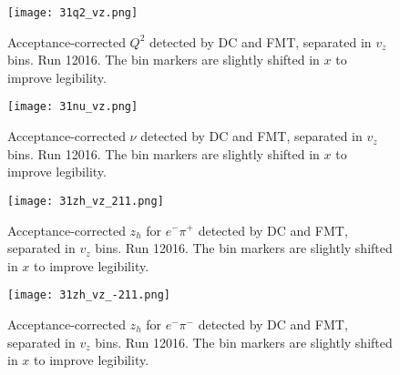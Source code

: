     \begin{figure}
        \centering
        \texttt{[image: 31q2\_vz.png]}
        \caption[Acceptance-corrected $Q^2$ separated in $v_z$ bins]
        {Acceptance-corrected $Q^2$ detected by DC and FMT, separated in $v_z$ bins.
        Run 12016.
        The bin markers are slightly shifted in $x$ to improve legibility.}
        \label{fig::14.31::q2_vz}
    \end{figure}

    \begin{figure}
        \centering
        \texttt{[image: 31nu\_vz.png]}
        \caption[Acceptance-corrected $\nu$ separated in $v_z$ bins]
        {Acceptance-corrected $\nu$ detected by DC and FMT, separated in $v_z$ bins.
        Run 12016.
        The bin markers are slightly shifted in $x$ to improve legibility.}
        \label{fig::14.31::nu_vz}
    \end{figure}

    \begin{figure}
        \centering
        \texttt{[image: 31zh\_vz\_211.png]}
        \caption[Acceptance-corrected $z_h$ for $e^-\pi^+$ separated in $v_z$ bins]
        {Acceptance-corrected $z_h$ for $e^-\pi^+$ detected by DC and FMT, separated in $v_z$ bins.
        Run 12016.
        The bin markers are slightly shifted in $x$ to improve legibility.}
        \label{fig::14.31::zh_211_vz}
    \end{figure}

    \begin{figure}
        \centering
        \texttt{[image: 31zh\_vz\_-211.png]}
        \caption[Acceptance-corrected $z_h$ for $e^-\pi^-$ separated in $v_z$ bins]
        {Acceptance-corrected $z_h$ for $e^-\pi^-$ detected by DC and FMT, separated in $v_z$ bins.
        Run 12016.
        The bin markers are slightly shifted in $x$ to improve legibility.}
        \label{fig::14.31::zh_-211_vz}
    \end{figure}

